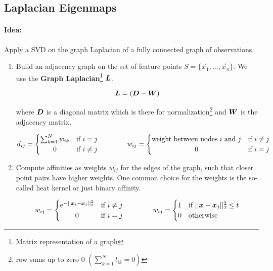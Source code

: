
\subsection{Laplacian Eigenmaps}

\paragraph{Idea:} Apply a SVD on the graph Laplacian of a fully connected graph of observations.

\begin{enumerate}
    \item Build an adjacency graph on the set of feature points \(S=\{\vec{x}_1, \dots, \vec{x}_n\}\). We use the \textbf{Graph Laplacian}\footnote{Matrix representation of a graph} $\bm{L}$.

      \[\bm{L} = (\bm{D} - \bm{W})\]

      where \(\bm{D}\) is a diagonal matrix which is there for normalization\footnote{row sums up to zero \(0\) \(\left(\sum_{k=1}^N l_{ik} = 0\right)\)} and \(\bm{W}\) is the adjacency matrix.

      \[d_{ij} = \begin{cases} \sum_{k=1}^N w_{ik} & \text{if } i=j \\ \hfil 0 & \text{if } i \neq j \end{cases}
        \qquad \qquad w_{ij} = \begin{cases} \text{weight between nodes } i \ \text{and } j & \text{if } i\neq j \\ \hfil 0 & \text{if } i = j\end{cases}\]

    \item Compute affinities as weights \(w_{ij}\) for the edges of the graph, such that closer point pairs have higher weights. One common choice for the weights is the so-called heat kernel or just binary affinity.

      \[w_{ij} = \begin{cases} \euler^{-||\vec{x}_i - \vec{x}_j||_2^2}  & \text{if } i\neq j \\ \hfil 0 & \text{if } i = j\end{cases}
        \qquad \qquad w_{ij} = \begin{cases} 1 & \text{if } ||\vec{x}-\vec{x}_j||_2^2 \leq t \\ 0 & \text{otherwise} \end{cases}\]


\end{enumerate}

